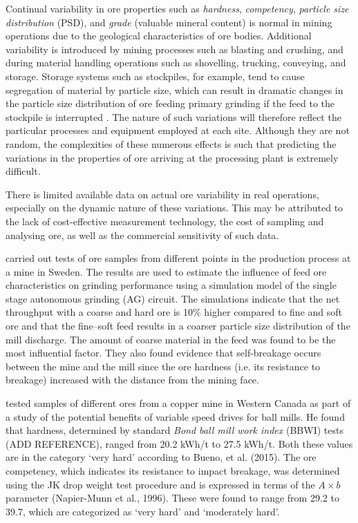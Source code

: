 Continual variability in ore properties such as \textit{hardness}, \textit{competency}, \textit{particle size distribution} (PSD), and \textit{grade} (valuable mineral content) is normal in mining operations due to the geological characteristics of ore bodies. Additional variability is introduced by mining processes such as blasting and crushing, and during material handling operations such as shovelling, trucking, conveying, and storage. Storage systems such as stockpiles, for example, tend to cause segregation of material by particle size, which can result in dramatic changes in the particle size distribution of ore feeding primary grinding if the feed to the stockpile is interrupted \citep{estrada_hybrid_2014}. The nature of such variations will therefore reflect the particular processes and equipment employed at each site. Although they are not random, the complexities of these numerous effects is such that predicting the variations in the properties of ore arriving at the processing plant is extremely difficult.

There is limited available data on actual ore variability in real operations, especially on the dynamic nature of these variations. This may be attributed to the lack of cost-effective measurement technology, the cost of sampling and analysing ore, as well as the commercial sensitivity of such data.

\cite{hahne_ore_2003} carried out tests of ore samples from different points in the production process at a mine in Sweden. The results are used to estimate the influence of feed ore characteristics on grinding performance using a simulation model of the single stage autonomous grinding (AG) circuit. The simulations indicate that the net throughput with a coarse and hard ore is 10\% higher compared to fine and soft ore and that the fine–soft feed results in a coarser particle size distribution of the mill discharge. The amount of coarse material in the feed was found to be the most influential factor. They also found evidence that self-breakage occurs between the mine and the mill since the ore hardness (i.e. its resistance to breakage) increased with the distance from the mining face.

\cite{liu_development_2018} tested samples of different ores from a copper mine in Western Canada as part of a study of the potential benefits of variable speed drives for ball mills. He found that hardness, determined by standard \textit{Bond ball mill work index} (BBWI) tests  (ADD REFERENCE), ranged from 20.2 kWh/t to 27.5 kWh/t. Both these values are in the category `very hard' according to Bueno, et al. (2015). The ore competency, which indicates its resistance to impact breakage, was determined using the JK drop weight test procedure and is expressed in terms of the $A\times{b}$ parameter (Napier-Munn et al., 1996). These were found to range from 29.2 to 39.7, which are categorized as `very hard' and `moderately hard'.

